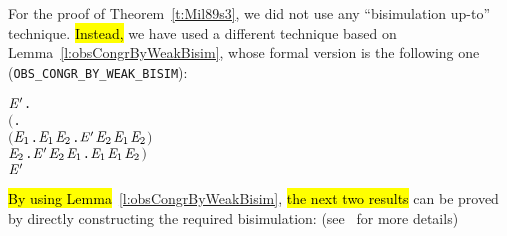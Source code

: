 For the proof of Theorem~\ref{t:Mil89s3}, we did not use any
``bisimulation up-to'' technique.
\hl{Instead,} we have used a different
technique based on Lemma~\ref{l:obsCongrByWeakBisim}, whose formal
version is the following one (\texttt{OBS_CONGR_BY_WEAK_BISIM}):
\begin{alltt}
\HOLTokenTurnstile{}   \HOLSymConst{\HOLTokenImp{}}
   \HOLSymConst{\HOLTokenForall{}} \ensuremath{\HOLBoundVar{E}\sp{\prime}}.
       \ensuremath{(}\HOLSymConst{\HOLTokenForall{}}.
            \ensuremath{(}\HOLSymConst{\HOLTokenForall{}}\ensuremath{\HOLBoundVar{E}\sb{\mathrm{1}}}.  \HOLTokenTransBegin{}\HOLTokenTransEnd \ensuremath{\HOLBoundVar{E}\sb{\mathrm{1}}} \HOLSymConst{\HOLTokenImp{}} \HOLSymConst{\HOLTokenExists{}}\ensuremath{\HOLBoundVar{E}\sb{\mathrm{2}}}. \ensuremath{\HOLBoundVar{E}\sp{\prime}} \HOLTokenWeakTransBegin{}\HOLTokenWeakTransEnd \ensuremath{\HOLBoundVar{E}\sb{\mathrm{2}}} \HOLSymConst{\HOLTokenConj{}}  \ensuremath{\HOLBoundVar{E}\sb{\mathrm{1}}} \ensuremath{\HOLBoundVar{E}\sb{\mathrm{2}}}\ensuremath{)} \HOLSymConst{\HOLTokenConj{}}
            \HOLSymConst{\HOLTokenForall{}}\ensuremath{\HOLBoundVar{E}\sb{\mathrm{2}}}. \ensuremath{\HOLBoundVar{E}\sp{\prime}} \HOLTokenTransBegin{}\HOLTokenTransEnd \ensuremath{\HOLBoundVar{E}\sb{\mathrm{2}}} \HOLSymConst{\HOLTokenImp{}} \HOLSymConst{\HOLTokenExists{}}\ensuremath{\HOLBoundVar{E}\sb{\mathrm{1}}}.  \HOLTokenWeakTransBegin{}\HOLTokenWeakTransEnd \ensuremath{\HOLBoundVar{E}\sb{\mathrm{1}}} \HOLSymConst{\HOLTokenConj{}}  \ensuremath{\HOLBoundVar{E}\sb{\mathrm{1}}} \ensuremath{\HOLBoundVar{E}\sb{\mathrm{2}}}\ensuremath{)} \HOLSymConst{\HOLTokenImp{}}
        \HOLSymConst{\HOLTokenObsCongr} \ensuremath{\HOLBoundVar{E}\sp{\prime}}
\end{alltt}
\hl{By using Lemma}~\ref{l:obsCongrByWeakBisim}, \hl{the next two results} can be proved by 
directly constructing the required bisimulation:
(see~\cite{Tian:2017wrba} for more details)
